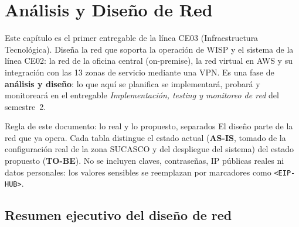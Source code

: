 \chapter{Análisis y Diseño de Red}
\label{chap:ce03-red}



Este capítulo es el primer entregable de la línea CE03 (Infraestructura
Tecnológica). Diseña la red que soporta la operación de WISP y el sistema de la línea
CE02: la red de la oficina central (on-premise), la red virtual en AWS y su
integración con las 13 zonas de servicio mediante una VPN. Es una fase de
\textbf{análisis y diseño}: lo que aquí se planifica se implementará, probará y
monitoreará en el entregable \emph{Implementación, testing y monitoreo de red} del
semestre~2.

\begin{upeubox}{Regla de este documento: lo real y lo propuesto, separados}
El diseño parte de la red que ya opera. Cada tabla distingue el estado actual
(\textbf{AS-IS}, tomado de la configuración real de la zona SUCASCO y del despliegue
del sistema) del estado propuesto (\textbf{TO-BE}). No se incluyen claves, contraseñas,
IP públicas reales ni datos personales: los valores sensibles se reemplazan por
marcadores como \texttt{<EIP-HUB>}.
\end{upeubox}

\section{Resumen ejecutivo del diseño de red}
\label{sec:ce03-red-resumen}

